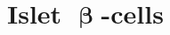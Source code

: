 












\newpage





\section{ Islet \( \mathbf{\upbeta} \)-cells}  %
\label{sec:human_ipscs}  

